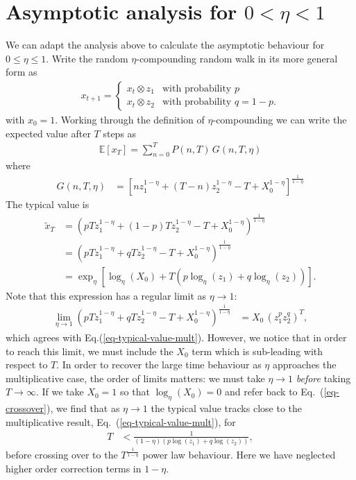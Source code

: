 \documentclass[11pt]{article}
\begin{document}
\section{Asymptotic analysis for $ 0 < \eta < 1$}

We can adapt the analysis above to calculate the asymptotic behaviour for $0 \leq \eta \leq 1$. Write the random $\eta$-compounding random walk in its more general form as
\begin{align}
\label{eq-etaRandomWalk2}
x_{t+1} = \left\{ 
\begin{array}{ll}
x_t \otimes z_1 & \text{with probability $p$}\\
x_t \otimes z_2  & \text{with probability $q=1-p$}.
\end{array}
\right.
\end{align}
with $x_0 = 1$.
Working through the definition of $\eta$-compounding we can write the expected value after $T$ steps as
\begin{align}
\label{eq-expected-value-eta}
 \mathbb{E}\left[x_T \right]  =  \sum_{n=0}^T  P(n,T) \,G(n, T, \eta)
\end{align}
where
\begin{align}
G(n, T, \eta) &= \left[ n z_1^{1-\eta} + (T-n) z_2^{1-\eta} -T + X_0^{1-\eta}\right]^\frac{1}{1-\eta}
\end{align}
The typical value is
\begin{align}
\nonumber \widetilde{x}_T &= \left( p T z_1^{1-\eta} + (1-p) T z_2^{1-\eta} - T+X_0^{1-\eta} \right)^\frac{1}{1-\eta}\\
\label{eq-typical-value-eta}&=  \left( p T z_1^{1-\eta} +  q T z_2^{1-\eta} - T+X_0^{1-\eta} \right)^\frac{1}{1-\eta}\\
\nonumber &= \exp_\eta\left[\log_\eta(X_0) + T \left(p \log_\eta(z_1) + q \log_\eta(z_2)\right)\right].
\end{align}
Note that this expression has a regular limit as $\eta \to 1$:
\begin{align}
\label{eq-typical-value-mult}
\lim_{\eta \to 1}  \left( p T z_1^{1-\eta} +  q T z_2^{1-\eta} - T+X_0^{1-\eta} \right)^\frac{1}{1-\eta} &= X_0\,\left( z_1^p z_2^q \right)^T,
\end{align}
which agrees with Eq.(\ref{eq-typical-value-mult}). However, we notice that in order to reach this limit,
we must include the $X_0$ term which is sub-leading with respect to $T$. In order to recover the large time behaviour as $\eta$ approaches the multiplicative case, the order of limits matters: we must take $\eta \to 1$ {\em before} taking $T \to \infty$. If we take $X_0=1$ so that $\log_\eta(X_0)=0$  and refer back to Eq.~(\ref{eq-crossover}), we find that as $\eta \to 1$ the typical value tracks close to the multiplicative result, Eq.~(\ref{eq-typical-value-mult}), for 
\begin{align}
T &< \frac{1}{(1-\eta)\left(p \log(z_1) + q \log(z_2) \right)},
\end{align}
before crossing over to the $T^\frac{1}{1-\eta}$ power law behaviour.  Here we have neglected higher order correction terms in $1-\eta$.
\end{document}
